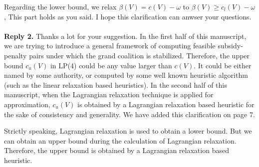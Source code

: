 \documentclass[11pt]{article}
\begin{document}
Regarding the lower bound, we relax $\beta(V) = c(V) - \omega$ to $\beta(V) \geq c_l(V) - \omega$,
This part holds as you said.
I hope this clarification can anwser your questions.
\\[4mm]
%
%
~\\[2mm]

\noindent \textbf{Reply 2.}
Thanks a lot for your suggestion.
In the first half of this manuscript, we are trying to introduce a general framework of computing feasible subsidy-penalty pairs under which the grand coalition is stabilized.
Therefore, the upper bound $c_u(V)$ in LP(4) could be any value larger than $c(V)$.
It could be either named by some authority, or computed by some well known heuristic algorithm (such as the linear relaxation based heuristics).
In the second half of this manuscript, when the Lagrangian relaxation technique is applied for approximation, $c_u(V)$ is obtained by a Lagrangian relaxation based heuristic for the sake of consistency and generality. We have added this clarification on page 7.

Strictly speaking, Lagrangian relaxation is used to obtain a lower bound. But we can obtain an upper bound during the calculation of Lagrangian relaxation. Therefore, the upper bound is obtained by a Lagrangian relaxation based heuristic.
~\\[4mm]
\end{document}
